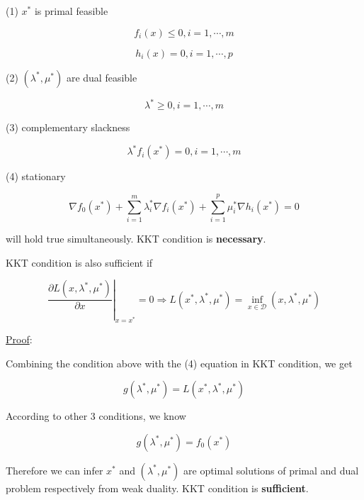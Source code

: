 \documentclass[UTF8]{ctexart}
\begin{document}
(1) $x^{*}$ is primal feasible\par
\begin{equation*}
f_{i}(x)\leq 0,i=1,\cdots,m
\end{equation*}\par
\begin{equation*}
h_{i}(x)=0,i=1,\cdots,p
\end{equation*}\par
(2) $(\lambda^{*},\mu^{*})$ are dual feasible\par
\begin{equation*}
\lambda^{*}\geq 0,i=1,\cdots,m
\end{equation*}\par
(3) complementary slackness\par
\begin{equation*}
\lambda^{*}f_{i}(x^{*})=0,i=1,\cdots,m
\end{equation*}\par
(4) stationary\par
\begin{equation*}
\nabla f_{0}(x^{*})+\sum_{i=1}^{m}\lambda_{i}^{*}\nabla f_{i}(x^{*})+\sum_{i=1}^{p}\mu_{i}^{*}\nabla h_{i}(x^{*})=0
\end{equation*}\par
will hold true simultaneously. KKT condition is \textbf{necessary}.\par
KKT condition is also sufficient if\par
\begin{equation*}
\left.\frac{\partial L(x,\lambda^{*},\mu^{*})}{\partial x}\right|_{x=x^{*}}=0\Rightarrow L(x^{*},\lambda^{*},\mu^{*})=\inf_{x\in\mathcal{D}}(x,\lambda^{*},\mu^{*})
\end{equation*}\par
\uline{Proof}:\par
Combining the condition above with the (4) equation in KKT condition, we get\par
\begin{equation*}
g(\lambda^{*},\mu^{*})=L(x^{*},\lambda^{*},\mu^{*})
\end{equation*}\par
According to other 3 conditions, we know\par
\begin{equation*}
g(\lambda^{*},\mu^{*})=f_{0}(x^{*})
\end{equation*}\par
Therefore we can infer $x^{*}$ and $(\lambda^{*},\mu^{*})$ are optimal solutions of primal and dual problem respectively from weak duality. KKT condition is \textbf{sufficient}.\par
\end{document}
